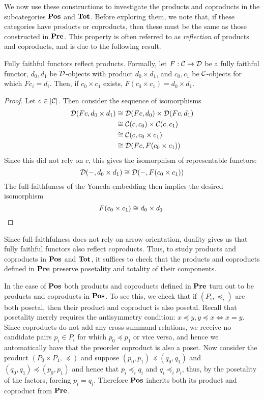 We now use these constructions to investigate the products and coproducts in the subcategories $\mathbf{Pos}$ and $\mathbf{Tot}$. Before exploring them, we note that, if these categories have products or coproducts, then these must be the same as those constructed in $\mathbf{Pre}$. This property is often referred to as \emph{reflection} of products and coproducts, and is due to the following result.

\begin{prop}
Fully faithful functors reflect products. Formally, let $F:\mathcal{C}\to\mathcal{D}$ be a fully faithful functor, $d_0,d_1$ be $\mathcal{D}$-objects with product $d_0\times d_1$, and $c_0,c_1$ be $\mathcal{C}$-objects for which $Fc_i=d_i$. Then, if $c_0\times c_1$ exists, $F(c_0\times c_1)=d_0\times d_1$. 
\end{prop}
\begin{proof}
Let $c\in|\mathcal{C}|$. Then consider the sequence of isomorphisms
\begin{align*}
    \mathcal{D}(Fc,d_0\times d_1)& \cong\mathcal{D}(Fc,d_0)\times\mathcal{D}(Fc,d_1)\\
    &\cong \mathcal{C}(c,c_0)\times\mathcal{C}(c,c_1) \\
    & \cong\mathcal{C}(c,c_0\times c_1) \\
    &\cong \mathcal{D}(Fc,F(c_0\times c_1))
\end{align*}
Since this did not rely on $c$, this gives the isomorphism of representable functors:
\[\mathcal{D}(-,d_0\times d_1)\cong\mathcal{D}(-,F(c_0\times c_1))\]
The full-faithfuness of the Yoneda embedding then implies the desired isomorphism \[F(c_0\times c_1)\cong d_0\times d_1. \qedhere\]
\end{proof}
Since full-faithfulness does not rely on arrow orientation, duality gives us that fully faithful functors also reflect coproducts. Thus, to study products and coproducts in $\mathbf{Pos}$ and $\mathbf{Tot}$, it suffices to check that the products and coproducts defined in $\mathbf{Pre}$ preserve posetality and totality of their components.

In the case of $\mathbf{Pos}$ both products and coproducts defined in $\mathbf{Pre}$ turn out to be products and coproducts in $\mathbf{Pos}$. To see this, we check that if $(P_i,\preceq_i)$ are both posetal, then their product and coproduct is also posetal. Recall that posetality merely requires the antisymmetry condition: $x\preceq y, y\preceq x\Leftrightarrow x=y$. Since coproducts do not add any cross-summand relations, we receive no candidate pairs $p_i\in P_i$ for which $p_0\preceq p_1$ or vice versa, and hence we automatically have that the preorder coproduct is also a poset. Now consider the product $(P_0\times P_1,\preceq)$ and suppose $(p_0,p_1)\preceq (q_0,q_1)$ and $(q_0,q_1)\preceq(p_0,p_1)$ and hence that $p_i\preceq_i q_i$ and $q_i\preceq_i p_i$, thus, by the posetality of the factors, forcing $p_i=q_i$. Therefore $\mathbf{Pos}$ inherits both its product and coproduct from $\mathbf{Pre}$.

